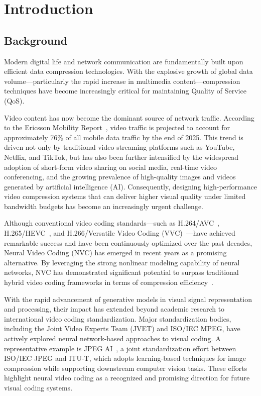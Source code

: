 
\chapter{Introduction}

\section{Background}
Modern digital life and network communication are fundamentally built upon efficient data compression technologies. With the explosive growth of global data volume—particularly the rapid increase in multimedia content—compression techniques have become increasingly critical for maintaining Quality of Service (QoS).

Video content has now become the dominant source of network traffic. According to the Ericsson Mobility Report~\cite{57}, video traffic is projected to account for approximately 76\% of all mobile data traffic by the end of 2025. This trend is driven not only by traditional video streaming platforms such as YouTube, Netflix, and TikTok, but has also been further intensified by the widespread adoption of short-form video sharing on social media, real-time video conferencing, and the growing prevalence of high-quality images and videos generated by artificial intelligence (AI). Consequently, designing high-performance video compression systems that can deliver higher visual quality under limited bandwidth budgets has become an increasingly urgent challenge.

Although conventional video coding standards—such as H.264/AVC~\cite{43}, H.265/HEVC~\cite{38}, and H.266/Versatile Video Coding (VVC)~\cite{44}—have achieved remarkable success and have been continuously optimized over the past decades, Neural Video Coding (NVC) has emerged in recent years as a promising alternative. By leveraging the strong nonlinear modeling capability of neural networks, NVC has demonstrated significant potential to surpass traditional hybrid video coding frameworks in terms of compression efficiency~\cite{61}.

With the rapid advancement of generative models in visual signal representation and processing, their impact has extended beyond academic research to international video coding standardization. Major standardization bodies, including the Joint Video Experts Team (JVET) and ISO/IEC MPEG, have actively explored neural network-based approaches to visual coding. A representative example is JPEG AI~\cite{02}, a joint standardization effort between ISO/IEC JPEG and ITU-T, which adopts learning-based techniques for image compression while supporting downstream computer vision tasks. These efforts highlight neural video coding as a recognized and promising direction for future visual coding systems.

